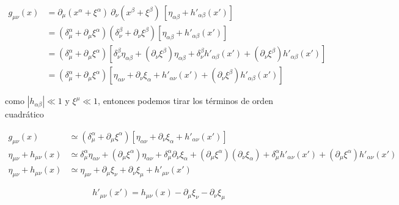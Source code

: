\begin{equation}
    \begin{split}
        g_{\mu\nu} (x) &= \partial_\mu \left( x^\alpha + \xi^\alpha \right) \ \partial_\nu \left( x^\beta + \xi^\beta \right) \ \left[ \eta_{\alpha \beta} + h'_{\alpha \beta} (x') \right]\\
        &= \left( \delta^\alpha_\mu + \partial_\mu \xi^\alpha \right) \left( \delta^\beta_\nu + \partial_\nu \xi^\beta \right) \left[ \eta_{\alpha \beta} + h'_{\alpha \beta} (x') \right]\\
        &= \left( \delta^\alpha_\mu + \partial_\mu \xi^\alpha \right) \left[ \delta^\beta_\nu \eta_{\alpha \beta} + \left( \partial_\nu \xi^\beta \right) \eta_{\alpha \beta} + \delta^\beta_\nu h'_{\alpha \beta} (x') + \left( \partial_\nu \xi^\beta \right) h'_{\alpha \beta} (x') \right]\\
        &= \left( \delta^\alpha_\mu + \partial_\mu \xi^\alpha \right) \left[ \eta_{\alpha \nu} + \partial_\nu \xi_\alpha + h'_{\alpha \nu} (x') + \left( \partial_\nu \xi^\beta \right) h'_{\alpha \beta} (x') \right]
    \end{split}
\end{equation}

\noindent
como $\left| h_{\alpha \beta} \right| \ll 1$ y $\xi^\mu \ll 1$, entonces podemos tirar los términos de orden cuadrático

\begin{equation}
    \begin{split}
        g_{\mu\nu} (x) &\simeq \left( \delta^\alpha_\mu + \partial_\mu \xi^\alpha \right) \left[ \eta_{\alpha \nu} + \partial_\nu \xi_\alpha + h'_{\alpha \nu} (x') \right]\\
        \eta_{\mu\nu} + h_{\mu\nu} (x) &\simeq \delta^\alpha_\mu \eta_{\alpha \nu} + \left( \partial_\mu \xi^\alpha \right) \eta_{\alpha \nu} + \delta^\alpha_\mu \partial_\nu \xi_\alpha + \left( \partial_\mu \xi^\alpha \right) \left( \partial_\nu \xi_\alpha \right) + \delta_\mu^\alpha h'_{\alpha \nu} (x') + \left( \partial_\mu \xi^\alpha \right) h'_{\alpha \nu} (x')\\
        \eta_{\mu \nu} + h_{\mu \nu} (x) &\simeq \eta_{\mu \nu} + \partial_\mu \xi_\nu + \partial_\nu \xi_\mu + h'_{\mu \nu} (x') 
    \end{split}
\end{equation}

\begin{equation}
    h'_{\mu \nu} (x') = h_{\mu \nu} (x) - \partial_\mu \xi_\nu - \partial_\nu \xi_\mu 
\end{equation}

